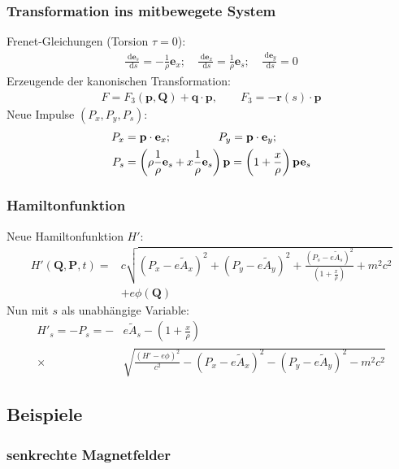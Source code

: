 \documentclass[hyperref={pdfpagelabels=false}]{beamer}
\newcommand {\dx} {\; \mathrm{d} }              %
\begin{document}
\begin{frame}
 \frametitle{Transformation ins mitbewegete System}
 \pause
 Frenet-Gleichungen (Torsion $\tau=0$):
 \begin{align*}
  \frac{\dx \mathbf{e}_s}{\dx s} = -\frac{1}{\rho}\mathbf{e}_x;\quad\frac{\dx \mathbf{e}_x}{\dx s} = \frac{1}{\rho}\mathbf{e}_s;\quad\frac{\dx \mathbf{e}_y}{\dx s} = 0
 \end{align*}
 Erzeugende der kanonischen Transformation:
 \begin{align*}
  F = F_3(\mathbf{p},\mathbf{Q}) + \mathbf{q}\cdot\mathbf{p}, \qquad F_3 = -\mathbf{r}(s)\cdot\mathbf{p}
 \end{align*}
 Neue Impulse $(P_x, P_y,P_s)$:
 \begin{align*}
  P_x &= \mathbf{p}\cdot\mathbf{e}_x; \hspace{1.45cm} P_y = \mathbf{p}\cdot\mathbf{e}_y;\\
  P_s &= \left(\rho\frac{1}{\rho}\mathbf{e}_s+x\frac{1}{\rho}\mathbf{e}_s\right)\mathbf{p} = \left(1+\frac{x}{\rho}\right)\mathbf{p}\mathbf{e}_s
 \end{align*}

\end{frame}

\begin{frame}
 \frametitle{Hamiltonfunktion}
 \pause
 Neue Hamiltonfunktion $H'$:
 \begin{align*}
  H'(\mathbf{Q},\mathbf{P},t) = &c\sqrt{(P_x-e\tilde{A}_x)^2+(P_y-e\tilde{A}_y)^2+\frac{(P_s-e\tilde{A}_s)^2}{\left(1+\frac{x}{\rho}\right)}+m^2c^2} \\
  &+ e\phi(\mathbf{Q})
 \end{align*}
 Nun mit $s$ als unabhängige Variable:
 \begin{align*}
  H'_s = -P_s = -&e\tilde{A}_s-\left(1+\frac{x}{\rho}\right)\\
  \times& \sqrt{\frac{(H'-e\phi)^2}{c^2}-(P_x-e\tilde{A}_x)^2-(P_y-e\tilde{A}_y)^2 -m^2c^2}
 \end{align*}
\end{frame}



\subsection{Beispiele}
\begin{frame}
\frametitle{senkrechte Magnetfelder}
 \pause

\end{frame}
\end{document}
